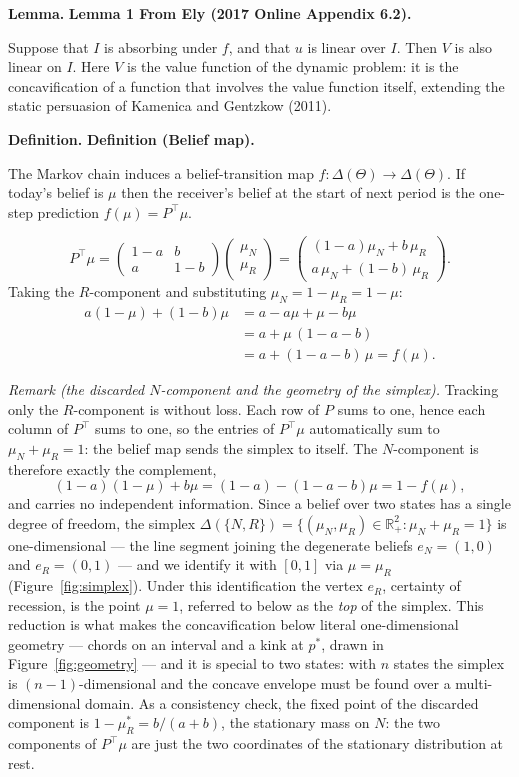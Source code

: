 \documentclass[12pt]{article}
\newenvironment{Definition}[2][]{%
    \begin{mdframed}[
        linewidth=0.5pt,
        backgroundcolor=white,
        skipabove=8pt,
        skipbelow=8pt,
        innertopmargin=6pt,
        innerbottommargin=6pt
    ]
    \ifthenelse{\equal{#2}{}}
        {\textbf{Definition#1.}}
        {\textbf{Definition #1(#2).}}
    \rmfamily\ignorespaces
}{%
    \end{mdframed}%
}
\newenvironment{boxedlemma}[2][]{%
    \begin{mdframed}[
        linewidth=0.5pt,
        backgroundcolor=white,
        skipabove=8pt,
        skipbelow=8pt,
        innertopmargin=6pt,
        innerbottommargin=6pt
    ]
    \ifthenelse{\equal{#2}{}}
        {\textbf{Lemma#1.}}
        {\textbf{Lemma #1#2.}}
    \rmfamily\ignorespaces
}{%
    \end{mdframed}%
}
\begin{document}
\begin{boxedlemma}{ 1 From Ely (2017 Online Appendix 6.2)}
Suppose that $I$ is absorbing under $f$, and that $u$ is linear over $I$. Then $V$ is also linear on $I$. Here $V$ is the value function of the dynamic problem: it is the concavification of a function that involves the value function itself, extending the static persuasion of Kamenica and Gentzkow (2011).
\end{boxedlemma}

\begin{Definition}{Belief map}
The Markov chain induces a belief-transition map $f:\Delta(\Theta)\to\Delta(\Theta)$. If today's belief is $\mu$ then the receiver's belief at the start of next period is the one-step prediction $f(\mu) = P^{\top}\mu$.
\end{Definition}
\[
P^{\top}\mu=
\begin{pmatrix}1-a & b\\ a & 1-b\end{pmatrix}
\begin{pmatrix}\mu_N\\ \mu_R\end{pmatrix}
=\begin{pmatrix}(1-a)\mu_N + b\,\mu_R\\[4pt] a\,\mu_N + (1-b)\,\mu_R\end{pmatrix}.
\]
Taking the $R$-component and substituting $\mu_N = 1-\mu_R = 1-\mu$:
\begin{align*}
a(1-\mu)+(1-b)\mu &= a - a\mu + \mu - b\mu\\
&= a + \mu\,(1-a-b)\\
&= a + (1-a-b)\,\mu = f(\mu).
\end{align*}

\noindent\emph{Remark (the discarded $N$-component and the geometry of the simplex).} Tracking only the $R$-component is without loss. Each row of $P$ sums to one, hence each column of $P^{\top}$ sums to one, so the entries of $P^{\top}\mu$ automatically sum to $\mu_N+\mu_R=1$: the belief map sends the simplex to itself. The $N$-component is therefore exactly the complement,
\[
(1-a)(1-\mu)+b\mu = (1-a)-(1-a-b)\mu = 1-f(\mu),
\]
and carries no independent information. Since a belief over two states has a single degree of freedom, the simplex $\Delta(\{N,R\})=\{(\mu_N,\mu_R)\in\mathbb{R}^2_+:\mu_N+\mu_R=1\}$ is one-dimensional --- the line segment joining the degenerate beliefs $e_N=(1,0)$ and $e_R=(0,1)$ --- and we identify it with $[0,1]$ via $\mu=\mu_R$ (Figure~\ref{fig:simplex}). Under this identification the vertex $e_R$, certainty of recession, is the point $\mu=1$, referred to below as the \emph{top} of the simplex. This reduction is what makes the concavification below literal one-dimensional geometry --- chords on an interval and a kink at $p^*$, drawn in Figure~\ref{fig:geometry} --- and it is special to two states: with $n$ states the simplex is $(n-1)$-dimensional and the concave envelope must be found over a multi-dimensional domain. As a consistency check, the fixed point of the discarded component is $1-\mu_R^* = b/(a+b)$, the stationary mass on $N$: the two components of $P^{\top}\mu$ are just the two coordinates of the stationary distribution at rest.
\end{document}

